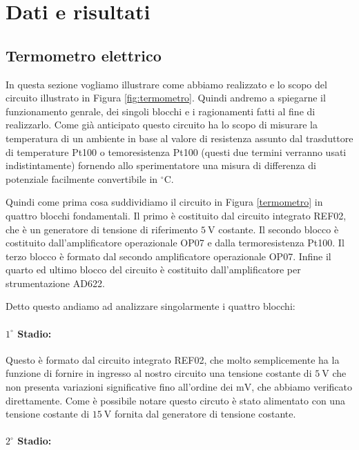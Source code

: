 \section*{Dati e risultati}

\subsection*{Termometro elettrico}

In questa sezione vogliamo illustrare come abbiamo realizzato e lo scopo del circuito illustrato in Figura \ref{fig:termometro}. Quindi andremo a spiegarne il funzionamento genrale, dei singoli blocchi e i ragionamenti fatti al fine di realizzarlo.
Come già anticipato questo circuito ha lo scopo di misurare la temperatura di un ambiente in base al valore di resistenza assunto dal trasduttore di temperature Pt100 o temoresistenza Pt100 (questi due termini verranno usati indistintamente) fornendo allo sperimentatore una misura di differenza di potenziale facilmente convertibile in $^\circ$C.

Quindi come prima cosa suddividiamo il circuito in Figura \ref{termometro} in quattro blocchi fondamentali.
Il primo è costituito dal circuito integrato REF02, che è un generatore di tensione di riferimento $\SI{+5}{\volt}$ costante.
Il secondo blocco è costituito dall'amplificatore operazionale OP07 e dalla termoresistenza Pt100.
Il terzo blocco è formato dal secondo amplificatore operazionale OP07.
Infine il quarto ed ultimo blocco del circuito è costituito dall'amplificatore per strumentazione AD622.

Detto questo andiamo ad analizzare singolarmente i quattro blocchi:

\paragraph*{$1^\circ$ Stadio:}

Questo è formato dal circuito integrato REF02, che molto semplicemente ha la funzione di fornire in ingresso al nostro circuito una tensione costante di $\SI{+5}{\volt}$ che non presenta variazioni significative fino all'ordine dei $\si{\milli\volt}$, che abbiamo verificato direttamente.
Come è possibile notare questo circuto è stato alimentato con una tensione costante di $\SI{+15}{\volt}$ fornita dal generatore di tensione costante.

\paragraph*{$2^\circ$ Stadio:}

